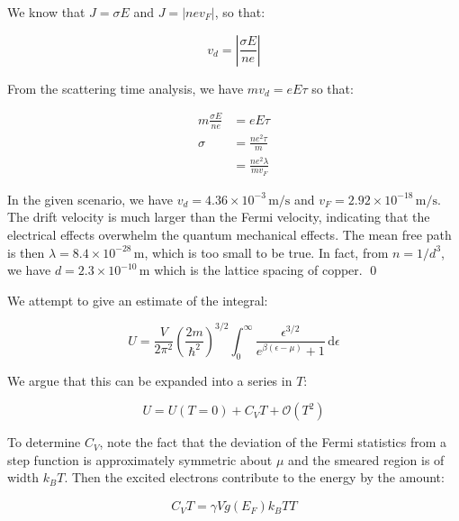 \documentclass[12pt]{article}
\begin{document}
We know that $J = \sigma E$ and $J = \left\lvert nev_{F} \right\rvert$, so that:

\begin{equation}
    v_{d} = \left\lvert \frac{\sigma E}{ne} \right\rvert
\end{equation}

From the scattering time analysis, we have $mv_{d} = eE\tau$ so that:

\begin{equation}
    \begin{split}
        m \frac{\sigma E}{ne} &= eE\tau \\
        \sigma &= \frac{ne^{2}\tau}{m} \\
        &= \frac{ne^{2}\lambda}{mv_{F}}
    \end{split}
\end{equation}

In the given scenario, we have $v_{d} = 4.36 \times 10^{-3} \, \mathrm{m/s}$ and $v_{F} = 2.92 \times 10^{-18} \, \mathrm{m/s}$. The drift velocity is much larger than the Fermi velocity, indicating that the electrical effects overwhelm the quantum mechanical effects. The mean free path is then $\lambda = 8.4 \times 10^{-28} \, \mathrm{m}$, which is too small to be true. In fact, from $n = 1/d^3$, we have $d = 2.3 \times 10^{-10} \, \mathrm{m}$ which is the lattice spacing of copper.
\qed




We attempt to give an estimate of the integral:

\begin{equation}
    U = \frac{V}{2\pi^{2}} \left( \frac{2m}{\hbar^{2}} \right)^{3/2} \int_{0}^{\infty} \frac{\epsilon^{3/2}}{e^{\beta(\epsilon - \mu)} + 1} \, \mathrm{d}\epsilon
\end{equation}

We argue that this can be expanded into a series in $T$:

\begin{equation}
    U = U(T = 0) + C_{V} T + \mathcal{O}(T^{2})
\end{equation}

To determine $C_{V}$, note the fact that the deviation of the Fermi statistics from a step function is approximately symmetric about $\mu$ and the smeared region is of width $k_{B}T$. Then the excited electrons contribute to the energy by the amount:

\begin{equation}
    C_{V} T = \gamma V \tilde{g}(E_{F}) k_{B}T T
\end{equation}
\end{document}
